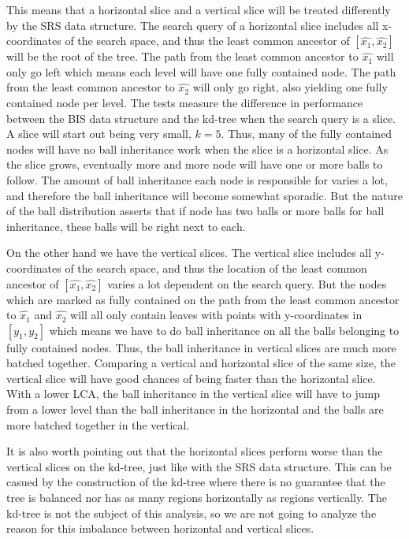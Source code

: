 This means that a horizontal slice and a vertical slice will be treated differently by the SRS data structure. The search query of a horizontal slice includes all x-coordinates of the search space, and thus the least common ancestor of $[\hat{x_1}, \hat{x_2}]$ will be the root of the tree. The path from the least common ancestor to $\hat{x_1}$ will only go left which means each level will have one fully contained node. The path from the least common ancestor to $\hat{x_2}$ will only go right, also yielding one fully contained node per level. The tests measure the difference in performance between the BIS data structure and the kd-tree when the search query is a slice. A slice will start out being very small, $k=5$. Thus, many of the fully contained nodes will have no ball inheritance work when the slice is a horizontal slice. As the slice grows, eventually more and more node will have one or more balls to follow. The amount of ball inheritance each node is responsible for varies a lot, and therefore the ball inheritance will become somewhat sporadic. But the nature of the ball distribution asserts that if node has two balls or more balls for ball inheritance, these balls will be right next to each.

On the other hand we have the vertical slices. The vertical slice includes all y-coordinates of the search space, and thus the location of the least common ancestor of $[\hat{x_1}, \hat{x_2}]$ varies a lot dependent on the search query. But the nodes which are marked as fully contained on the path from the least common ancestor to $\hat{x_1}$ and $\hat{x_2}$ will all only contain leaves with points with y-coordinates in $[y_1, y_2]$ which means we have to do ball inheritance on all the balls belonging to fully contained nodes. Thus, the ball inheritance in vertical slices are much more batched together. Comparing a vertical and horizontal slice of the same size, the vertical slice will have good chances of being faster than the horizontal slice. With a lower LCA, the ball inheritance in the vertical slice will have to jump from a lower level than the ball inheritance in the horizontal and the balls are more batched together in the vertical. 

It is also worth pointing out that the horizontal slices perform worse than the vertical slices on the kd-tree, just like with the SRS data structure. This can be casued by the construction of the kd-tree where there is no guarantee that the tree is balanced nor has as many regions horizontally as regions vertically. The kd-tree is not the subject of this analysis, so we are not going to analyze the reason for this imbalance between horizontal and vertical slices.

